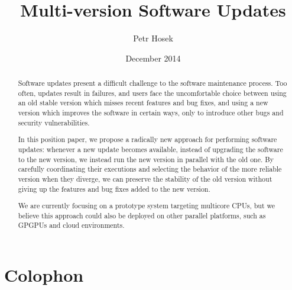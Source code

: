 \documentclass[a4paper,12pt,oneside,minionpro,dottedtoc]{thesis}
\title{Multi-version Software Updates}
\author{Petr Hosek}
\date{December 2014}
\begin{document}
\maketitle

\section*{Colophon}

\preface
\begin{abstract}
Software updates present a difficult challenge to the software
maintenance process.  Too often, updates result in failures, and users
face the uncomfortable choice between using an old stable version
which misses recent features and bug fixes, and using a new version
which improves the software in certain ways, only to introduce other
bugs and security vulnerabilities.

In this position paper, we propose a radically new approach for
performing software updates: whenever a new update becomes available,
instead of upgrading the software to the new version, we instead
run the new version in parallel with the old one.  By carefully
coordinating their executions and selecting the behavior of the more
reliable version when they diverge, we can preserve the stability of
the old version without giving up the features and bug fixes added to
the new version.

We are currently focusing on a prototype system targeting multicore
CPUs, but we believe this approach could also be deployed on other
parallel platforms, such as GPGPUs and cloud environments.
\end{abstract}

\makededication

\tableofcontents
\listoftables
\listoffigures
\listoflistings

\body











{
  
  
}

\appendix
\end{document}
